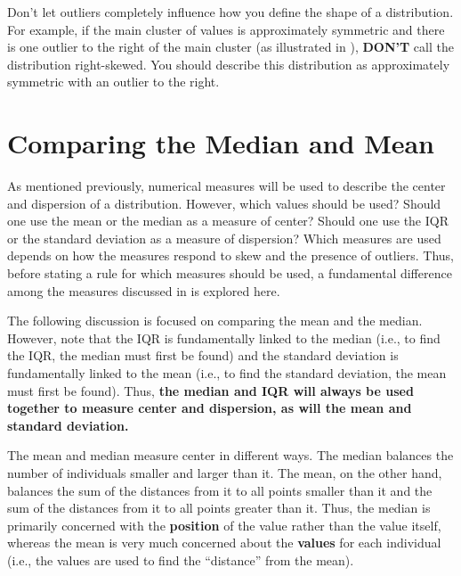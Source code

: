 \documentclass[10pt,openany]{book}\usepackage[]{graphicx}\usepackage[]{color}
\begin{document}
Don't let outliers completely influence how you define the shape of a distribution. For example, if the main cluster of values is approximately symmetric and there is one outlier to the right of the main cluster (as illustrated in ), \textbf{DON'T} call the distribution right-skewed. You should describe this distribution as approximately symmetric with an outlier to the right.


\vspace{-12pt}



\section{Comparing the Median and Mean} \label{sect:MeanMedian}
As mentioned previously, numerical measures will be used to describe the center and dispersion of a distribution. However, which values should be used? Should one use the mean or the median as a measure of center? Should one use the IQR or the standard deviation as a measure of dispersion? Which measures are used depends on how the measures respond to skew and the presence of outliers. Thus, before stating a rule for which measures should be used, a fundamental difference among the measures discussed in  is explored here.

The following discussion is focused on comparing the mean and the median. However, note that the IQR is fundamentally linked to the median (i.e., to find the IQR, the median must first be found) and the standard deviation is fundamentally linked to the mean (i.e., to find the standard deviation, the mean must first be found). Thus, \textbf{the median and IQR will always be used together to measure center and dispersion, as will the mean and standard deviation.}

The mean and median measure center in different ways. The median balances the number of individuals smaller and larger than it. The mean, on the other hand, balances the sum of the distances from it to all points smaller than it and the sum of the distances from it to all points greater than it. Thus, the median is primarily concerned with the \textbf{position} of the value rather than the value itself, whereas the mean is very much concerned about the \textbf{values} for each individual (i.e., the values are used to find the ``distance'' from the mean).
\end{document}
